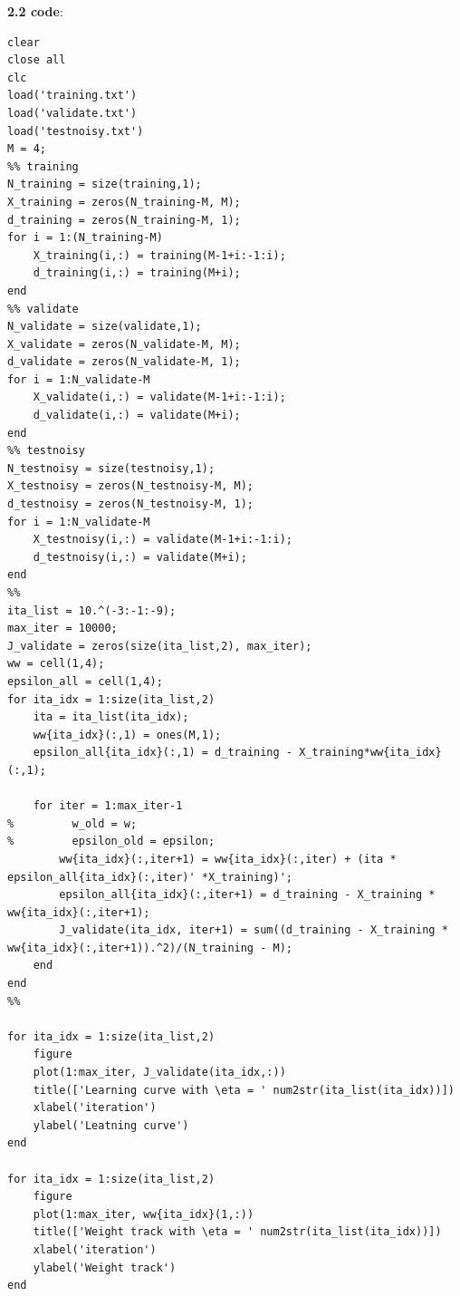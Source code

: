 \documentclass[a4paper]{article}
\begin{document}
\begin{spacing}{2.0}
\newpage
\textbf{2.2 code}:
\begin{lstlisting}
clear
close all
clc
load('training.txt')
load('validate.txt')
load('testnoisy.txt')
M = 4;
%% training
N_training = size(training,1);
X_training = zeros(N_training-M, M);
d_training = zeros(N_training-M, 1);
for i = 1:(N_training-M)
    X_training(i,:) = training(M-1+i:-1:i);
    d_training(i,:) = training(M+i);
end
%% validate
N_validate = size(validate,1);
X_validate = zeros(N_validate-M, M);
d_validate = zeros(N_validate-M, 1);
for i = 1:N_validate-M
	X_validate(i,:) = validate(M-1+i:-1:i);
	d_validate(i,:) = validate(M+i);
end
%% testnoisy
N_testnoisy = size(testnoisy,1);
X_testnoisy = zeros(N_testnoisy-M, M);
d_testnoisy = zeros(N_testnoisy-M, 1);
for i = 1:N_validate-M
	X_testnoisy(i,:) = validate(M-1+i:-1:i);
	d_testnoisy(i,:) = validate(M+i);
end
%%
ita_list = 10.^(-3:-1:-9);
max_iter = 10000;
J_validate = zeros(size(ita_list,2), max_iter);
ww = cell(1,4);
epsilon_all = cell(1,4);
for ita_idx = 1:size(ita_list,2)
    ita = ita_list(ita_idx);
    ww{ita_idx}(:,1) = ones(M,1);
    epsilon_all{ita_idx}(:,1) = d_training - X_training*ww{ita_idx}(:,1);
    
    for iter = 1:max_iter-1
%         w_old = w;
%         epsilon_old = epsilon;
        ww{ita_idx}(:,iter+1) = ww{ita_idx}(:,iter) + (ita * epsilon_all{ita_idx}(:,iter)' *X_training)';
        epsilon_all{ita_idx}(:,iter+1) = d_training - X_training *  ww{ita_idx}(:,iter+1);
        J_validate(ita_idx, iter+1) = sum((d_training - X_training * ww{ita_idx}(:,iter+1)).^2)/(N_training - M);
    end
end
%%

for ita_idx = 1:size(ita_list,2)
    figure
    plot(1:max_iter, J_validate(ita_idx,:))
    title(['Learning curve with \eta = ' num2str(ita_list(ita_idx))])
    xlabel('iteration')
    ylabel('Leatning curve')
end

for ita_idx = 1:size(ita_list,2)
    figure
    plot(1:max_iter, ww{ita_idx}(1,:))
    title(['Weight track with \eta = ' num2str(ita_list(ita_idx))])
	xlabel('iteration')
    ylabel('Weight track')
end
\end{lstlisting}

\end{spacing}
\end{document}
